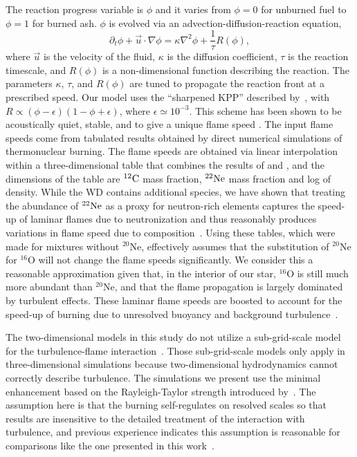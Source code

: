 \documentclass[preprint2]{aastex63}
\newcommand{\C}[1]{\ensuremath{{}^{#1}{\rm C}}}
\newcommand{\Ne}[1]{\ensuremath{{}^{#1}{\rm Ne}}}
\newcommand{\pv}{\ensuremath{\phi}}
\begin{document}
The reaction progress variable is $\phi$ and it varies from $\phi=0$ for
unburned fuel to $\phi=1$ for burned ash. $\phi$ is evolved
via an advection-diffusion-reaction equation,
\begin{equation}
  \label{eq:ard}
  \partial_t \pv + \vec{u}\cdot\nabla \pv = \kappa \nabla^2 \pv +
\frac{1}{\tau} R\left(\phi\right) ,
\end{equation}
where $\vec{u}$ is the velocity of the fluid, $\kappa$ is the
diffusion coefficient, $\tau$ is the reaction timescale, and $R(\phi)$ is
a non-dimensional function describing the reaction. The parameters
$\kappa$, $\tau$, and $R(\phi)$ are tuned to propagate the reaction
front at a prescribed speed.  Our model uses the ``sharpened KPP''
 described by~\cite{VladWeirRyzh06},
with $R\propto(\phi-\epsilon)(1-\phi+\epsilon)$, where
$\epsilon \simeq 10^{-3}$.  This scheme has been shown to be
acoustically quiet, stable, and to give a unique flame speed
\citep{townsley.calder.ea:flame}. The input flame speeds come from
tabulated results obtained by direct numerical simulations of
thermonuclear burning.
{\color{blue}
The flame speeds are obtained via linear interpolation within a 
three-dimensional table that combines the results of \citet{timmes92} 
and \citet{Chametal08}, and the dimensions of the table are \C{12} 
mass fraction, \Ne{22} mass fraction and log of density. While the
WD contains additional species, we have shown that treating the
abundance of \Ne{22} as a proxy for neutron-rich elements captures the
speed-up of laminar flames due to neutronization and thus reasonably 
produces variations in flame speed due to composition~\citep{jacketal2010}.}
{\color{green} Using these tables, which were made for mixtures without $^{20}$Ne,
effectively assumes that the substitution of $^{20}$Ne for $^{16}$O will not
change the flame speeds significantly.  We consider this a reasonable
approximation given that, in the interior of our star, $^{16}$O is still much
more abundant than $^{20}$Ne, and that the flame propagation is largely
dominated by turbulent effects.}
These laminar flame speeds are boosted to account for the speed-up 
of burning due to unresolved buoyancy and background turbulence~\citep{Khok95,
gamezo.khokhlov.ea:thermonuclear,townsley.calder.ea:flame,jacketal2014}.

The two-dimensional models in this study do not utilize a sub-grid-scale
model for the turbulence-flame
interaction~\citep[See][for examples]{Schmetal06a,Schmetal06b,jacketal2014}.
Those sub-grid-scale models only apply in three-dimensional
simulations because two-dimensional hydrodynamics cannot
correctly describe turbulence. The simulations we present
use the minimal enhancement based on the Rayleigh-Taylor
strength introduced by~\citet{townsley.calder.ea:flame}. The
assumption here is that the burning self-regulates on resolved
scales so that results are insensitive to the detailed treatment
of the interaction with turbulence, and previous experience
indicates this assumption is reasonable for comparisons
like the one presented in this work~\citep{townsley.calder.ea:flame,
willcoxetal2016}.
\end{document}
